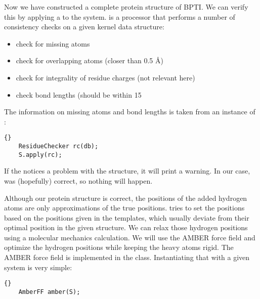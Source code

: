 \noindent
Now we have constructed a complete protein structure of BPTI. We can verify
this by applying a  to the system.
 is a processor that performs a number of consistency
checks on a given kernel data structure:
\begin{itemize}
	\item check for missing atoms
	\item check for overlapping atoms (closer than 0.5 \AA)
	\item check for integrality of residue charges (not relevant here)
	\item check bond lengths (should be within 15%
\end{itemize}
The information on missing atoms and bond lengths is taken from an instance
of :

\begin{lstlisting}{}
	ResidueChecker rc(db);
	S.apply(rc);
\end{lstlisting}
	
\noindent
If the  notices a problem with the structure, it will 
print a warning. In our case, was (hopefully) correct, so nothing will happen.

Although our protein structure is correct, the positions of the added hydrogen
atoms are only approximations of the true positions.
 tries to set the positions based on the
positions given in the  templates, which usually deviate
from their optimal position in the given structure. We can relax those
hydrogen positions using a molecular mechanics calculation.
We will use the AMBER force field\cite{AMBER95} and optimize the hydrogen 
positions while keeping the heavy atoms rigid. The AMBER force field is
implemented in the  class. Instantiating that with a given
system is very simple:

\begin{lstlisting}{}
	AmberFF amber(S);
\end{lstlisting}

\noindent
